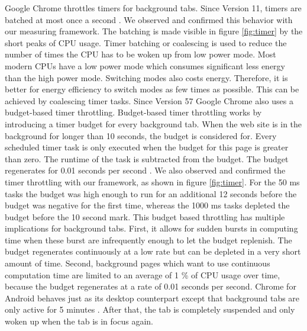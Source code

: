 \documentclass[
	ruledheaders=section,%
	class=report,%
	thesis={type=bachelor},%
	accentcolor=9c,%
	custommargins=true,%
	marginpar=false,%
	parskip=half-,%
	fontsize=11pt,%
]{tudapub}
\begin{document}
  Google Chrome throttles timers for background tabs. Since Version 11, timers are batched at most once a second \cite{chrome-background-tabs}. We observed and confirmed this behavior with our measuring framework. The batching is made visible in figure \ref{fig:timer} by the short peaks of CPU usage. Timer batching or coalescing is used to reduce the number of times the CPU has to be woken up from low power mode. Most modern CPUs have a low power mode which consumes significant less energy than the high power mode. Switching modes also costs energy. Therefore, it is better for energy efficiency to switch modes as few times as possible. This can be achieved by coalescing timer tasks. Since Version 57 Google Chrome also uses a budget-based timer throttling. Budget-based timer throttling works by introducing a timer budget for every background tab. When the web site is in the background for longer than 10 seconds, the budget is considered for. Every scheduled timer task is only executed when the budget for this page is greater than zero. The runtime of the task is subtracted from the budget. The budget regenerates for 0.01 seconds per second \cite{chrome-background-tabs}. We also observed and confirmed the timer throttling with our framework, as shown in figure \ref{fig:timer}. For the 50 ms tasks the budget was high enough to run for an additional 12 seconds before the budget was negative for the first time, whereas the 1000 ms tasks depleted the budget before the 10 second mark. This budget based throttling has multiple implications for background tabs. First, it allows for sudden bursts in computing time when these burst are infrequently enough to let the budget replenish. The budget regenerates continuously at a low rate but can be depleted in a very short amount of time. Second, background pages which want to use continuous computation time are limited to an average of 1 \% of CPU usage over time, because the budget regenerates at a rate of 0.01 seconds per second. Chrome for Android behaves just as its desktop counterpart except that background tabs are only active for 5 minutes \cite{chrome-android-suspend}. After that, the tab is completely suspended and only woken up when the tab is in focus again.
\end{document}
